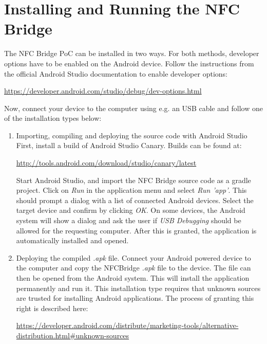 \section{Installing and Running the NFC Bridge}
The NFC Bridge PoC can be installed in two ways. For both methods, developer options have to be enabled on the Android device. Follow the instructions from the official Android Studio documentation to enable developer options:
\begin{framed}
\url{
https://developer.android.com/studio/debug/dev-options.html
}
\end{framed}
Now, connect your device to the computer using e.g. an USB cable and follow one of the installation types below:
\begin{enumerate}
\item Importing, compiling and deploying the source code with Android Studio
First, install a build of Android Studio Canary. Builds can be found at:
\begin{framed}
\url{http://tools.android.com/download/studio/canary/latest}
\end{framed}
Start Android Studio, and import the NFC Bridge source code as a gradle project. Click on \textit{Run} in the application menu and select \textit{Run 'app'}. This should prompt a dialog with a list of connected Android devices. Select the target device and confirm by clicking \textit{OK}.
On some devices, the Android system will show a dialog and ask the user if \textit{USB Debugging} should be allowed for the requesting computer.
After this is granted, the application is automatically installed and opened.
\item Deploying the compiled \textit{.apk} file.
Connect your Android powered device to the computer and copy the NFCBridge \textit{.apk} file to the device. The file can then be opened from the Android system. This will install the application permanently and run it.
This installation type requires that unknown sources are trusted for installing Android applications. The process of granting this right is described here:
\begin{framed}\url{https://developer.android.com/distribute/marketing-tools/alternative-distribution.html#unknown-sources}
\end{framed}
\end{enumerate}

